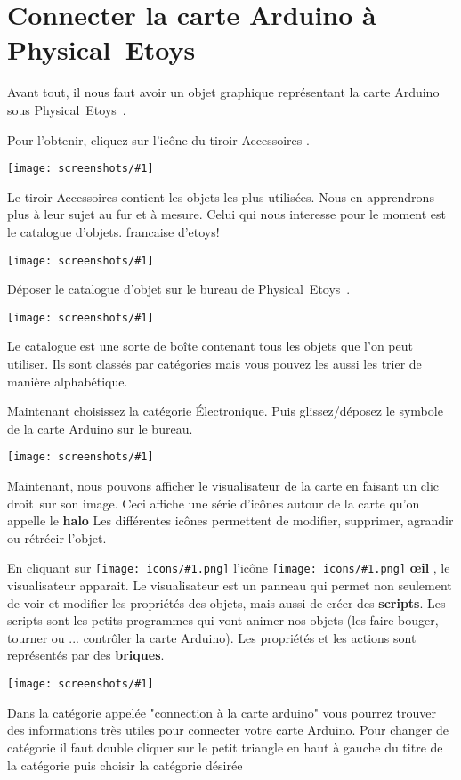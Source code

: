\documentclass[a4paper,12pt]{article}
\def\appName{Physical~Etoys~}
\def\rc{clic droit~}
\newcommand{\screenshot}[1]
{
\begin{center}
	\texttt{[image: screenshots/\#1]}
\end{center}
}
\newcommand{\important}[1]{\textbf{#1}}
\newcommand{\keyword}[2]{\important{\gls{#1}}}
\newcommand{\inserticon}[1]
{
\texttt{[image: icons/\#1.png]}
}
\newcommand{\icon}[2][]
{
\ifthenelse {\equal{#1} {}} {\inserticon{#2}} {l'icône \inserticon{#2} \important{#1}}
}
\begin{document}
\section{Connecter la carte Arduino à \appName}

Avant tout, il nous faut avoir un objet graphique représentant la carte Arduino
sous \appName.

Pour l'obtenir, cliquez sur l'icône du tiroir \og Accessoires \fg.

\screenshot{01.png}

Le tiroir \og Accessoires \fg contient les objets les plus utilisées. Nous en
apprendrons plus à leur sujet au fur et à mesure. Celui qui nous interesse pour
le moment est le catalogue d'objets. %
francaise d'etoys!

\screenshot{02.png}

Déposer le catalogue d'objet sur le bureau de \appName.

\screenshot{03.png}

Le catalogue est une sorte de boîte contenant tous les objets que l'on peut
utiliser. Ils sont classés par catégories mais vous pouvez les aussi les trier
de manière alphabétique.

Maintenant choisissez la catégorie \og Électronique\fg. Puis glissez/déposez le
symbole de la carte Arduino sur le bureau.

\screenshot{04.png}
  
Maintenant, nous pouvons afficher le visualisateur de la carte en faisant un
\rc sur son image. Ceci affiche une série d'icônes autour de la carte qu'on
appelle le \keyword{halo}. Les différentes icônes permettent de modifier,
supprimer, agrandir ou rétrécir l'objet.

En cliquant sur \icon[\oe il]{eye}, le visualisateur apparait. Le visualisateur
est un panneau qui permet non seulement de voir et modifier les propriétés des
objets, mais aussi de créer des \important{scripts}. Les scripts sont les
petits programmes qui vont animer nos objets (les faire bouger, tourner ou ...
contrôler la carte Arduino).  Les propriétés et les actions sont représentés
par des \important{briques}.

\screenshot{05.png}

Dans la catégorie appelée "connection à la carte arduino" vous pourrez trouver
des informations très utiles pour connecter votre carte Arduino. Pour changer
de catégorie il faut double cliquer sur le petit triangle en haut à gauche du
titre de la catégorie puis choisir la catégorie désirée
\end{document}
